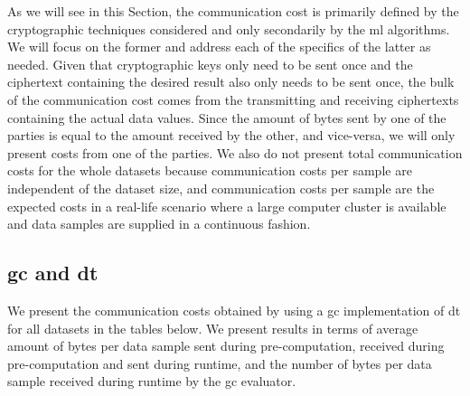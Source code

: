 As we will see in this Section, the communication cost is primarily defined by the cryptographic techniques considered and only secondarily by the \ac{ml} algorithms. We will focus on the former and address each of the specifics of the latter as needed. Given that cryptographic keys only need to be sent once and the ciphertext containing the desired result also only needs to be sent once, the bulk of the communication cost comes from the transmitting and receiving ciphertexts containing the actual data values. Since the amount of bytes sent by one of the parties is equal to the amount received by the other, and vice-versa, we will only present costs from one of the parties. We also do not present total communication costs for the whole datasets because communication costs per sample are independent of the dataset size, and communication costs per sample are the expected costs in a real-life scenario where a large computer cluster is available and data samples are supplied in a continuous fashion.


\subsection{\acl{gc} and \acl{dt}}

We present the communication costs obtained by using a \ac{gc} implementation of \ac{dt} for all datasets in the tables below. We present results in terms of average amount of bytes per data sample sent during pre-computation, received during pre-computation and sent during runtime, and the number of bytes per data sample received during runtime by the \ac{gc} evaluator.


